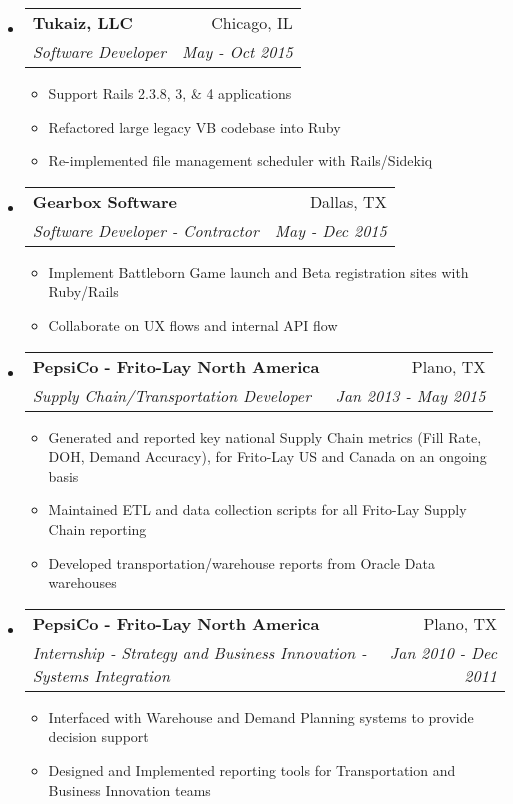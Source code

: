 \documentclass[letterpaper,11pt]{article}
\makeatletter
\newcommand{\resitem}[1]{\item #1 \vspace{-3pt}}
\newcommand{\ressubheading}[4]{
	\begin{tabular*}{6.5in}{l@{\extracolsep{\fill}}r}
			\textbf{#1} & #2 \\
			\textit{#3} & \textit{#4} \\
	\end{tabular*}\vspace{-6pt}}
\makeatother
\begin{document}
\begin{itemize}

\item
	\ressubheading{Tukaiz, LLC}{Chicago, IL}{Software Developer}{May - Oct 2015}
	\begin{itemize}
		\resitem{Support Rails 2.3.8, 3, \& 4 applications }
		\resitem{Refactored large legacy VB codebase into Ruby}
		\resitem{Re-implemented file management scheduler with Rails/Sidekiq}
	\end{itemize}

\item 
	\ressubheading{Gearbox Software}{Dallas, TX}{Software Developer - Contractor}{May - Dec 2015}
	\begin{itemize}
		\resitem{Implement Battleborn Game launch and Beta registration sites with Ruby/Rails}
		\resitem{Collaborate on UX flows and internal API flow}
	\end{itemize}



\item
	\ressubheading{PepsiCo - Frito-Lay North America}{Plano, TX}{Supply Chain/Transportation Developer}{Jan 2013 - May 2015}
	\begin{itemize}
		\resitem{Generated and reported key national Supply Chain metrics (Fill
		Rate, DOH, Demand Accuracy), for Frito-Lay US and Canada on an ongoing basis}
		\resitem{Maintained ETL and data collection scripts for all
		Frito-Lay Supply Chain reporting}
		\resitem{Developed transportation/warehouse reports from Oracle Data warehouses}
	\end{itemize}



\item
	\ressubheading{PepsiCo - Frito-Lay North America}{Plano, TX}{Internship -
		Strategy and Business Innovation - Systems Integration}{Jan 2010 - Dec 2011}
	\begin{itemize}
		\resitem{Interfaced with Warehouse and Demand Planning systems to provide
		decision support}
		\resitem{Designed and Implemented reporting tools for Transportation and
		Business Innovation teams}
	\end{itemize}

\end{itemize}
\end{document}
